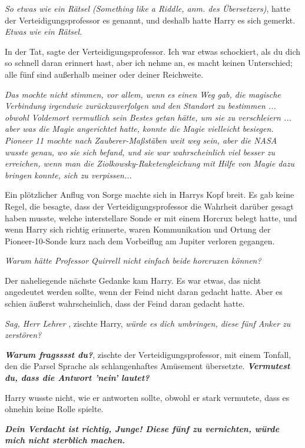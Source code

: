 \emph{So etwas wie ein Rätsel (\glqq{}Something like a Riddle\grqq{}, anm. des
Übersetzers)}, hatte der Verteidigungsprofessor es genannt, und deshalb hatte
Harry es sich gemerkt.
\emph{Etwas wie ein Rätsel.}

\glqq{}In der Tat\grqq{}, sagte der Verteidigungsprofessor. \glqq{}Ich war etwas
schockiert, als du dich so schnell daran erinnert hast, aber ich nehme an, es
macht keinen Unterschied; alle fünf sind außerhalb meiner oder deiner
Reichweite.\grqq{}

\emph{Das mochte nicht stimmen, vor allem, wenn es einen Weg gab, die magische
Verbindung irgendwie zurückzuverfolgen und den Standort zu bestimmen ... obwohl
Voldemort vermutlich sein Bestes getan hätte, um sie zu verschleiern ... aber
was die Magie angerichtet hatte, konnte die Magie vielleicht besiegen. Pioneer
11 mochte nach Zauberer-Maßstäben weit weg sein, aber die NASA wusste genau, wo
sie sich befand, und sie war wahrscheinlich viel besser zu erreichen, wenn man
die Ziolkowsky-Raketengleichung mit Hilfe von Magie dazu bringen konnte, sich zu
verpissen...}

Ein plötzlicher Anflug von Sorge machte sich in Harrys Kopf breit. Es gab keine
Regel, die besagte, dass der Verteidigungsprofessor die Wahrheit darüber gesagt
haben musste, welche interstellare Sonde er mit einem Horcrux belegt hatte, und
wenn Harry sich richtig erinnerte, waren Kommunikation und Ortung der
Pioneer-10-Sonde kurz nach dem Vorbeiflug am Jupiter verloren gegangen.

\emph{Warum hätte Professor Quirrell nicht einfach beide horcruxen können?}

Der naheliegende nächste Gedanke kam Harry. Es war etwas, das nicht angedeutet
werden sollte, wenn der Feind nicht daran gedacht hatte. Aber es schien äußerst
wahrscheinlich, dass der Feind daran gedacht hatte.

\glqq{}\emph{Sag, Herr Lehrer\grqq{}} , zischte Harry, \glqq{}\emph{würde es dich
umbringen, diese fünf Anker zu zerstören?}\grqq{}

\glqq{}\textbf{\emph{Warum fragsssst du?}}\grqq{}, zischte der
Verteidigungsprofessor, mit einem Tonfall, den die Parsel Sprache als
schlangenhaftes Amüsement übersetzte. \glqq{}\textbf{\emph{Vermutest du, dass die
Antwort 'nein' lautet?}}\grqq{}

Harry wusste nicht, wie er antworten sollte, obwohl er stark vermutete, dass es
ohnehin keine Rolle spielte.

\glqq{}\textbf{\emph{Dein Verdacht ist richtig, Junge! Diese fünf zu vernichten,
würde mich nicht sterblich machen.}}\grqq{}

